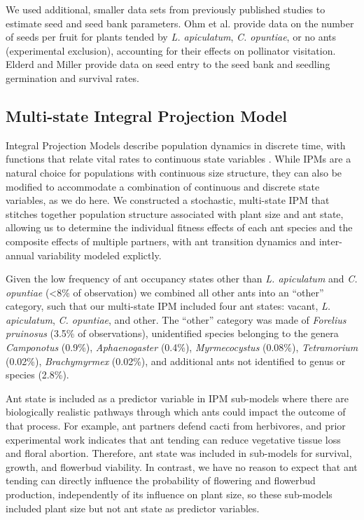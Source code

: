\documentclass[11pt]{article}
\begin{document}
We used additional, smaller data sets from previously published studies to estimate seed and seed bank parameters. 
Ohm et al. \citeyear{Ohm2014} provide data on the number of seeds per fruit for plants tended by \textit{L. apiculatum}, \textit{C. opuntiae}, or no ants (experimental exclusion), accounting for their effects on pollinator visitation. 
Elderd and Miller \citeyear{elderd2016quantifying} provide data on seed entry to the seed bank and seedling germination and survival rates. 


\subsection*{Multi-state Integral Projection Model}
Integral Projection Models describe population dynamics in discrete time, with functions that relate vital rates to continuous state variables \citep{ellnerbook}. 
While IPMs are a natural choice for populations with continuous size structure, they can also be modified to accommodate a combination of continuous and discrete state variables, as we do here. 
We constructed a stochastic, multi-state IPM that stitches together population structure associated with plant size and ant state, allowing us to determine the individual fitness effects of each ant species and the composite effects of multiple partners, with ant transition dynamics and inter-annual variability modeled explictly. 

Given the low frequency of ant occupancy states other than \textit{L. apiculatum} and \textit{C. opuntiae} (\textless8\% of observation) we combined all other ants into an ``other'' category, such that our multi-state IPM included four ant states: vacant, \textit{L. apiculatum}, \textit{C. opuntiae}, and other. 
The ``other'' category was made of \textit{Forelius pruinosus} (3.5\% of observations), unidentified species belonging to the genera \textit{Camponotus} (0.9\%), \textit{Aphaenogaster} (0.4\%), \textit{Myrmecocystus} (0.08\%), \textit{Tetramorium} (0.02\%), \textit{Brachymyrmex} (0.02\%), and additional ants not identified to genus or species (2.8\%). 

Ant state is included as a predictor variable in IPM sub-models where there are biologically realistic pathways through which ants could impact the outcome of that process. 
For example, ant partners defend cacti from herbivores, and prior experimental work indicates that ant tending can reduce vegetative tissue loss and floral abortion.
Therefore, ant state was included in sub-models for survival, growth, and flowerbud viability. 
In contrast, we have no reason to expect that ant tending can directly influence the probability of flowering and flowerbud production, independently of its influence on plant size, so these sub-models included plant size but not ant state as predictor variables. 
\end{document}
